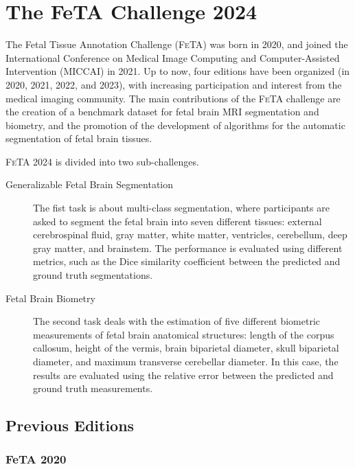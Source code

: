 \chapter{The FeTA Challenge 2024}
\vspace{1cm}

The Fetal Tissue Annotation Challenge (\textsc{FeTA}) \cite{FeTA2024} was born in 2020, and joined the International Conference on Medical Image Computing and Computer-Assisted Intervention (MICCAI) \cite{MICCAI} in 2021. Up to now, four editions have been organized (in 2020, 2021, 2022, and 2023), with increasing participation and interest from the medical imaging community. The main contributions of the \textsc{FeTA} challenge are the creation of a benchmark dataset for fetal brain MRI segmentation and biometry, and the promotion of the development of algorithms for the automatic segmentation of fetal brain tissues.

\textsc{FeTA} 2024 is divided into two sub-challenges.
\begin{description}
\item[Generalizable Fetal Brain Segmentation] The fist task is about multi-class segmentation, where participants are asked to segment the fetal brain into seven different tissues: external cerebrospinal fluid, gray matter, white matter, ventricles, cerebellum, deep gray matter, and brainstem. The performance is evaluated using different metrics, such as the Dice similarity coefficient between the predicted and ground truth segmentations.
\item[Fetal Brain Biometry] The second task deals with the estimation of five different biometric measurements of fetal brain anatomical structures: length of the corpus callosum, height of the vermis, brain biparietal diameter, skull biparietal diameter, and maximum transverse cerebellar diameter. In this case, the results are evaluated using the relative error between the predicted and ground truth measurements. \cite{FeTA2024_paper}
\end{description}

\section{Previous Editions}

\subsection{FeTA 2020}

